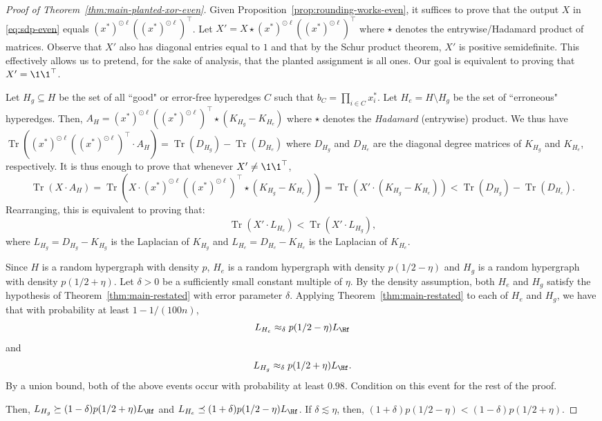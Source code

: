 \documentclass
[11pt,letterpaper]
{article}
\providecommand*{\Tr}{\mathop{\mathrm{Tr}}}
\begin{document}
\begin{proof}[Proof of Theorem~\ref{thm:main-planted-xor-even}]
Given Proposition~\ref{prop:rounding-works-even}, it suffices to prove that the output $X$ in \eqref{eq:sdp-even} equals $(x^*)^{\odot \ell}((x^*)^{\odot \ell})^{\top}$. Let $X' = X \star (x^*)^{\odot \ell}((x^*)^{\odot \ell})^{\top}$ where $\star$ denotes the entrywise/Hadamard product of matrices. Observe that $X'$ also has diagonal entries equal to $1$ and that by the Schur product theorem, $X'$ is positive semidefinite. This effectively allows us to pretend, for the sake of analysis, that the planted assignment is all ones. Our goal is equivalent to proving that $X' = \1 \1^{\top}$. 

Let $H_g \subseteq H$ be the set of all ``good" or error-free hyperedges $C$ such that $b_C = \prod_{i \in C} x^*_i$. Let $H_e = H \setminus H_g$ be the set of ``erroneous" hyperedges.  Then, $A_H = (x^*)^{\odot \ell}((x^*)^{\odot \ell})^{\top} \star (K_{H_g} - K_{H_e})$ where $\star$ denotes the \emph{Hadamard} (entrywise) product. We thus have $\Tr((x^*)^{\odot \ell}((x^*)^{\odot \ell})^{\top} \cdot A_H) = \Tr(D_{H_g}) - \Tr(D_{H_e})$ where $D_{H_g}$ and $D_{H_e}$ are the diagonal degree matrices of $K_{H_g}$ and $K_{H_e}$, respectively. It is thus enough to prove that whenever $X' \neq \1 \1^{\top}$, 
\[
\Tr(X \cdot A_H) = \Tr( X \cdot (x^*)^{\odot \ell}((x^*)^{\odot \ell})^{\top} \star (K_{H_g} - K_{H_e})) = \Tr(X' \cdot (K_{H_g} - K_{H_e})) < \Tr(D_{H_g}) - \Tr(D_{H_e}).
\]
Rearranging, this is equivalent to proving that:
\[
\Tr( X' \cdot L_{H_e}) <  \Tr(X' \cdot L_{H_g}),
\]
where $L_{H_g} = D_{H_g} - K_{H_g}$ is the Laplacian of $K_{H_g}$ and $L_{H_e} = D_{H_e} - K_{H_e}$ is the Laplacian of $K_{H_e}$. 


Since $H$ is a random hypergraph with density $p$, $H_e$ is a random hypergraph with density $p (1/2 - \eta)$ and $H_g$ is a random hypergraph with density $p (1/2 + \eta)$. Let $\delta>0$ be a sufficiently small constant multiple of $\eta$. By the density assumption, both $H_e$ and $H_g$ satisfy the hypothesis of Theorem~\ref{thm:main-restated} with error parameter $\delta$. Applying Theorem~\ref{thm:main-restated} to each of $H_e$ and $H_g$, we have that with probability at least $1-1/(100n)$, 
\[
L_{H_e} \approx_\delta p (1/2 - \eta) L_{\Hf}
\] 
and 
\[
L_{H_g} \approx_\delta p (1/2 + \eta) L_{\Hf}.
\]
By a union bound, both of the above events occur with probability at least $0.98$. Condition on this event for the rest of the proof. 

Then, $L_{H_g} \succeq (1-\delta) p (1/2 + \eta) L_{\Hf}$ and $L_{H_e} \preceq (1+ \delta) p (1/2 - \eta) L_{\Hf}$. If $\delta \lesssim \eta$, then, $(1+ \delta) p (1/2 - \eta) < (1-\delta) p (1/2 + \eta)$. 


\end{proof}
\end{document}
